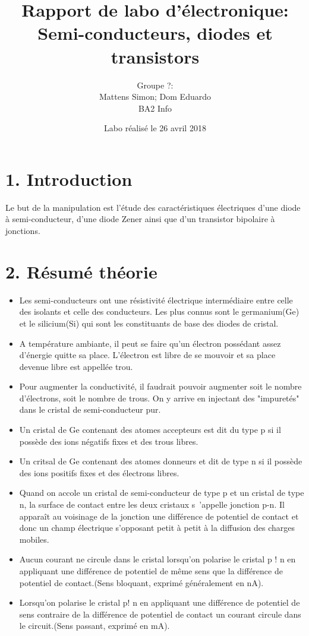 \documentclass{report}
\title{Rapport de labo d'\'electronique: \\ Semi-conducteurs, diodes et transistors}
\author{Groupe ?: \\ Mattens Simon; Dom Eduardo \\ BA2 Info}
\date{Labo r\'ealis\'e le 26 avril 2018}
\begin{document}
\maketitle


\section*{1. Introduction}
Le but de la manipulation est l'étude des caractéristiques électriques d'une diode à semi-conducteur, d'une diode Zener ainsi que d'un transistor bipolaire à jonctions.

\section*{2. R\'esum\'e th\'eorie}
\begin{itemize}
\item Les semi-conducteurs ont une résistivité électrique intermédiaire entre celle des isolants et celle des conducteurs. Les plus connus sont le germanium(Ge) et le silicium(Si) qui sont les constituants de base des diodes de cristal.
\item A température ambiante, il peut se faire qu'un électron possédant assez d'énergie quitte sa place. L'électron est libre de se mouvoir et sa place devenue libre est appellée trou.
\item Pour augmenter la conductivité, il faudrait pouvoir augmenter soit le nombre d'électrons, soit le nombre de trous. On y arrive en injectant des "impuretés" dans le cristal de semi-conducteur pur.
\item Un cristal de Ge contenant des atomes accepteurs est dit du type p si il possède des ions négatifs fixes et des trous libres.
\item Un critsal de Ge contenant des atomes donneurs et dit de type n si il possède des ions positifs fixes et des électrons libres.
\item Quand on accole un cristal de semi-conducteur de type p et un cristal de type n, la surface de contact entre les deux cristaux s\ 'appelle jonction p-n. Il apparaît au voisinage de la jonction une différence de potentiel de contact et donc un champ électrique s'opposant petit à petit à la diffusion des charges mobiles.
\item Aucun courant ne circule dans le cristal lorsqu'on polarise le cristal p ! n en appliquant une différence de potentiel de même sens que la différence de potentiel de contact.(Sens bloquant, exprimé généralement en nA).
\item Lorsqu'on polarise le cristal p! n en appliquant une différence de potentiel de sens contraire de la différence de potentiel de contact un courant circule dans le circuit.(Sens passant, exprimé en mA).

\end{itemize}
\end{document}
